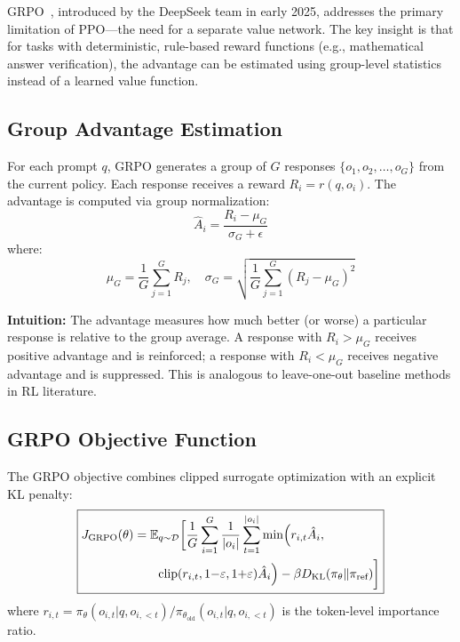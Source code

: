 GRPO~\cite{deepseek2025r1, shao2024deepseekmath}, introduced by the DeepSeek team in early 2025, addresses the primary limitation of PPO---the need for a separate value network. The key insight is that for tasks with deterministic, rule-based reward functions (e.g., mathematical answer verification), the advantage can be estimated using group-level statistics instead of a learned value function.

\subsection{Group Advantage Estimation}

For each prompt $q$, GRPO generates a group of $G$ responses $\{o_1, o_2, \ldots, o_G\}$ from the current policy. Each response receives a reward $R_i = r(q, o_i)$. The advantage is computed via group normalization:
\begin{equation}
\hat{A}_i = \frac{R_i - \mu_G}{\sigma_G + \epsilon}
\label{eq:grpo_adv}
\end{equation}
where:
\begin{equation}
\mu_G = \frac{1}{G}\sum_{j=1}^{G}R_j, \quad \sigma_G = \sqrt{\frac{1}{G}\sum_{j=1}^{G}(R_j - \mu_G)^2}
\end{equation}

\textbf{Intuition:} The advantage measures how much better (or worse) a particular response is relative to the group average. A response with $R_i > \mu_G$ receives positive advantage and is reinforced; a response with $R_i < \mu_G$ receives negative advantage and is suppressed. This is analogous to leave-one-out baseline methods in RL literature.

\subsection{GRPO Objective Function}

The GRPO objective combines clipped surrogate optimization with an explicit KL penalty:
\begin{equation}
\boxed{
\begin{aligned}
J_{\text{GRPO}}(\theta) = \mathbb{E}&_{q \sim \mathcal{D}}\biggl[\frac{1}{G}\sum_{i=1}^{G}\frac{1}{|o_i|}\sum_{t=1}^{|o_i|}\min\Bigl(r_{i,t}\hat{A}_i, \\
&\text{clip}(r_{i,t}, 1{-}\varepsilon, 1{+}\varepsilon)\hat{A}_i\Bigr) - \beta D_{\text{KL}}(\pi_\theta \| \pi_{\text{ref}})\biggr]
\end{aligned}
}
\label{eq:grpo}
\end{equation}
where $r_{i,t} = \pi_\theta(o_{i,t}|q, o_{i,<t}) / \pi_{\theta_{\text{old}}}(o_{i,t}|q, o_{i,<t})$ is the token-level importance ratio.

